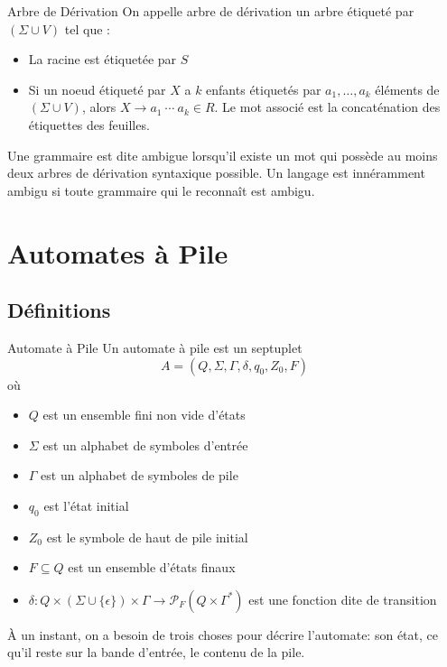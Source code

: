 \documentclass{cours}
\begin{document}
\begin{définition}{Arbre de Dérivation}{}
    On appelle arbre de dérivation un arbre étiqueté par $\left(\Sigma \cup V\right)$ tel que : 
    \begin{itemize}
        \item La racine est étiquetée par $S$
        \item Si un noeud étiqueté par $X$ a $k$ enfants étiquetés par $a_{1}, \ldots, a_{k}$ éléments de $\left(\Sigma \cup V\right)$, alors $X \rightarrow a_{1}\ \cdots \ a_{k} \in R$. Le mot associé est la concaténation des étiquettes des feuilles. 
    \end{itemize}
    
    Une grammaire est dite ambigue lorsqu'il existe un mot qui possède au moins deux arbres de dérivation syntaxique possible. Un langage est innéramment ambigu si toute grammaire qui le reconnaît est ambigu. 
\end{définition}

\section{Automates à Pile}
\subsection{Définitions}
\begin{définition}
    {Automate à Pile}{}
    Un automate à pile est un septuplet 
    \begin{equation*}
	    A = \left(Q, \Sigma, \Gamma, \delta, q_{0}, Z_{0}, F\right)
    \end{equation*}
    où
    \begin{itemize}
	    \item $Q$ est un ensemble fini non vide d'états
	    \item $\Sigma$ est un alphabet de symboles d'entrée
	    \item $\Gamma$ est un alphabet de symboles de pile
	    \item $q_{0}$ est l'état initial
	    \item $Z_{0}$ est le symbole de haut de pile initial
	    \item $F \subseteq Q$ est un ensemble d'états finaux
	    \item $\delta : Q \times \left(\Sigma\cup \{\epsilon\}\right) \times \Gamma \longrightarrow \mathcal{P}_{F}\left(Q\times \Gamma^{*}\right)$ est une fonction dite de transition
    \end{itemize}
\end{définition}
À un instant, on a besoin de trois choses pour décrire l'automate: son état, ce qu'il reste sur la bande d'entrée, le contenu de la pile. 
\end{document}
